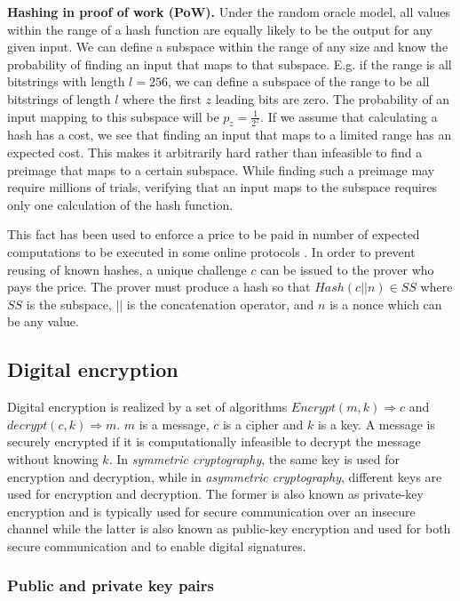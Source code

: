 \noindent
{\bf Hashing in proof of work (PoW).}
Under the random oracle model, all values within the range of a hash function are equally likely to be the output for any given input. We can define a subspace within the range of any size and know the probability of finding an input that maps to that subspace. E.g. if the range is all bitstrings with length $l=256$, we can define a subspace of the range to be all bitstrings of length $l$ where the first $z$ leading bits are zero. The probability of an input mapping to this subspace will be $p_z=\frac{1}{2^z}$. If we assume that calculating a hash has a cost, we see that finding an input that maps to a limited range has an expected cost. This makes it arbitrarily hard rather than infeasible to find a preimage that maps to a certain subspace. While finding such a preimage may require millions of trials, verifying that an input maps to the subspace requires only one calculation of the hash function.  

This fact has been used to enforce a price to be paid in number of expected computations to be executed in some online protocols \cite{dwork_pricing_1993,back_hashcash-denial_2002}. In order to prevent reusing of known hashes, a unique challenge $c$ can be issued to the prover who pays the price. The prover must produce a hash so that $Hash(c || n) \in SS$ where $SS$ is the subspace, $||$ is the concatenation operator, and $n$ is a nonce which can be any value. 


\subsection{Digital encryption}

Digital encryption is realized by a set of algorithms $Encrypt(m, k) \Rightarrow c$ and $decrypt(c, k) \Rightarrow m$. $m$ is a message, $c$ is a cipher and $k$ is a key. A message is securely encrypted if it is computationally infeasible to decrypt the message without knowing $k$. In \emph{symmetric cryptography}, the same key is used for encryption and decryption, while in \emph{asymmetric cryptography}, different keys are used for encryption and decryption. The former is also known as private-key encryption and is typically used for secure communication over an insecure channel while the latter is also known as public-key encryption and used for both secure communication and to enable digital signatures.

\subsubsection{Public and private key pairs}

